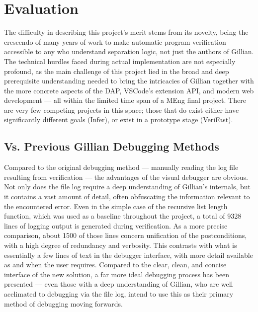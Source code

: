 
\chapter{Evaluation}\label{sec:eval}

The difficulty in describing this project's merit stems from its novelty,
being the crescendo of many years of work to make automatic program verification
accessible to any who understand separation logic, not just the authors of
Gillian. The technical hurdles faced during actual implementation are not
especially profound, as the main challenge of this project lied in the
broad and deep prerequisite understanding needed to bring the intricacies of
Gillian together with the more concrete aspects of the DAP, VSCode's extension
API, and modern web development --- all within the limited time span of a MEng
final project. There are very few competing projects in this space; those that
do exist either have significantly different goals (Infer), or exist in a
prototype stage (VeriFast).

\section{Vs. Previous Gillian Debugging Methods}

Compared to the original debugging method --- manually reading the log file
resulting from verification --- the advantages of the visual debugger are
obvious. Not only does the file log require a deep understanding of Gillian's
internals, but it contains a vast amount of detail, often obfuscating the
information relevant to the encountered error.
Even in the simple case of the recursive list length function, which was used as
a baseline throughout the project, a total of 9328 lines of logging output is
generated during verification. As a more precise comparison, about 1500 of those
lines concern unification of the postconditions, with a high degree of
redundancy and verbosity. This contrasts with what is essentially a few lines of
text in the debugger interface, with more detail available as and when the user
requires. Compared to the clear, clean, and concise interface of the new
solution, a far more ideal debugging process has been presented --- even those
with a deep understanding of Gillian, who are well acclimated to debugging via
the file log, intend to use this as their primary method of debugging moving
forwards.


